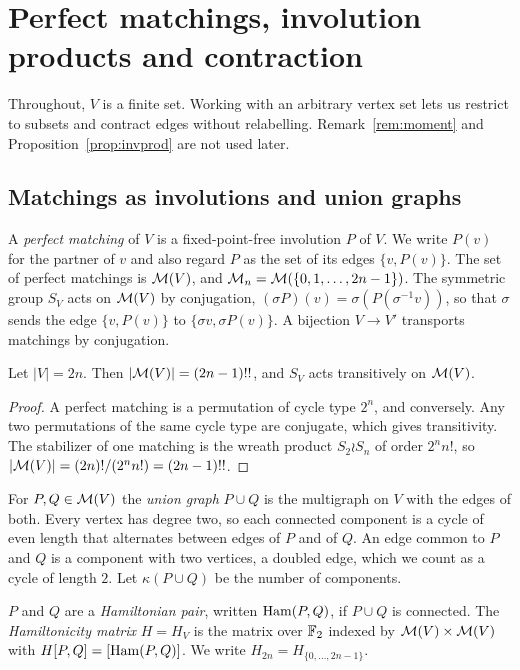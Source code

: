 \section{Perfect matchings, involution products and contraction}\label{sec:matchings}

Throughout, $V$ is a finite set. Working with an arbitrary vertex set lets us restrict to subsets and contract edges without relabelling. Remark~\ref{rem:moment} and Proposition~\ref{prop:invprod} are not used later.

\subsection{Matchings as involutions and union graphs}

A \emph{perfect matching} of $V$ is a fixed-point-free involution $P$ of $V$. We write $P(v)$ for the partner of $v$ and also regard $P$ as the set of its edges $\{v,P(v)\}$. The set of perfect matchings is $\mathcal{M}(V)$, and $\mathcal{M}_n=\mathcal{M}(\{0,1,\dots,2n-1\})$. The symmetric group $S_V$ acts on $\mathcal{M}(V)$ by conjugation, $(\sigma P)(v)=\sigma(P(\sigma^{-1}v))$, so that $\sigma$ sends the edge $\{v,P(v)\}$ to $\{\sigma v,\sigma P(v)\}$. A bijection $V\to V'$ transports matchings by conjugation.

\begin{proposition}\label{prop:count}
Let $|V|=2n$. Then $|\mathcal{M}(V)|=(2n-1)!!$, and $S_V$ acts transitively on $\mathcal{M}(V)$. %
\end{proposition}

\begin{proof}
A perfect matching is a permutation of cycle type $2^n$, and conversely. Any two permutations of the same cycle type are conjugate, which gives transitivity. The stabilizer of one matching is the wreath product $S_2\wr S_n$ of order $2^n n!$, so $|\mathcal{M}(V)|=(2n)!/(2^n n!)=(2n-1)!!$. %
\end{proof}

For $P,Q\in\mathcal{M}(V)$ the \emph{union graph} $P\cup Q$ is the multigraph on $V$ with the edges of both. Every vertex has degree two, so each connected component is a cycle of even length that alternates between edges of $P$ and of $Q$. An edge common to $P$ and $Q$ is a component with two vertices, a doubled edge, which we count as a cycle of length $2$. Let $\kappa(P\cup Q)$ be the number of components.

\begin{definition}\label{def:H}
$P$ and $Q$ are a \emph{Hamiltonian pair}, written $\operatorname{Ham}(P,Q)$, if $P\cup Q$ is connected. The \emph{Hamiltonicity matrix} $H=H_V$ is the matrix over $\mathbb{F}_2$ indexed by $\mathcal{M}(V)\times\mathcal{M}(V)$ with $H[P,Q]=[\operatorname{Ham}(P,Q)]$. We write $H_{2n}=H_{\{0,\dots,2n-1\}}$.
\end{definition}

